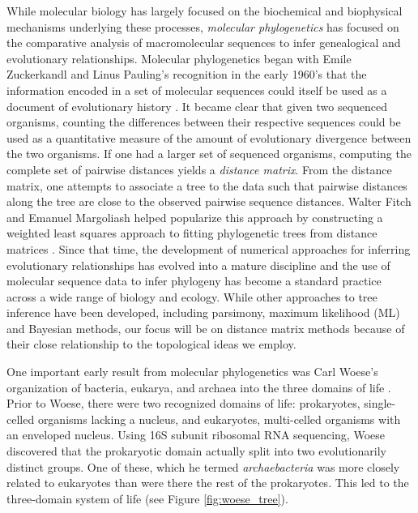 While molecular biology has largely focused on the biochemical and biophysical mechanisms underlying these processes, \emph{molecular phylogenetics} has focused on the comparative analysis of macromolecular sequences to infer genealogical and evolutionary relationships.
Molecular phylogenetics began with Emile Zuckerkandl and Linus Pauling's recognition in the early 1960's that the information encoded in a set of molecular sequences could itself be used as a document of evolutionary history \cite{Zuckerkandl:1962,Zuckerkandl:1965wi}.
It became clear that given two sequenced organisms, counting the differences between their respective sequences could be used as a quantitative measure of the amount of evolutionary divergence between the two organisms.
If one had a larger set of sequenced organisms, computing the complete set of pairwise distances yields a \emph{distance matrix}.
From the distance matrix, one attempts to associate a tree to the data such that pairwise distances along the tree are close to the observed pairwise sequence distances.
Walter Fitch and Emanuel Margoliash helped popularize this approach by constructing a weighted least squares approach to fitting phylogenetic trees from distance matrices \cite{Fitch:1967we}.
Since that time, the development of numerical approaches for inferring evolutionary relationships has evolved into a mature discipline and the use of molecular sequence data to infer phylogeny has become a standard practice across a wide range of biology and ecology.
While other approaches to tree inference have been developed, including parsimony, maximum likelihood (ML) and Bayesian methods, our focus will be on distance matrix methods because of their close relationship to the topological ideas we employ.

One important early result from molecular phylogenetics was Carl Woese's organization of bacteria, eukarya, and archaea into the three domains of life \cite{Woese:1977vd}.
Prior to Woese, there were two recognized domains of life: prokaryotes, single-celled organisms lacking a nucleus, and eukaryotes, multi-celled organisms with an enveloped nucleus.
Using 16S subunit ribosomal RNA sequencing, Woese discovered that the prokaryotic domain actually split into two evolutionarily distinct groups.
One of these, which he termed \emph{archaebacteria} was more closely related to eukaryotes than were there the rest of the prokaryotes.
This led to the three-domain system of life (see Figure \ref{fig:woese_tree}).

